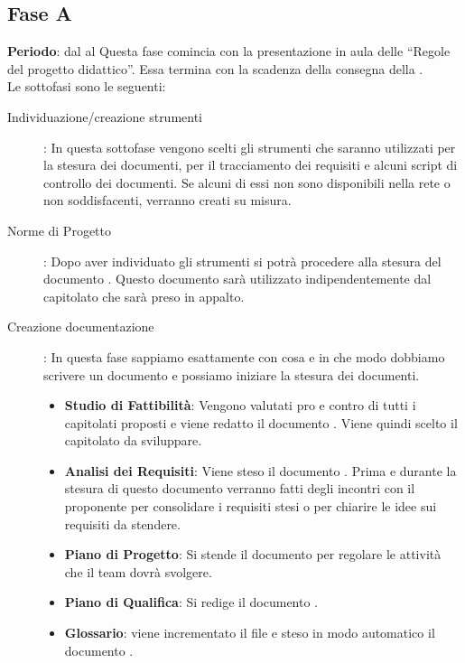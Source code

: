 \subsection{Fase A}
	\textbf{Periodo}: dal  al 
	Questa fase comincia con la presentazione in aula delle “Regole del progetto didattico”. Essa termina con la scadenza della consegna della .\\Le sottofasi sono le seguenti:
	\begin{description}
		\item[Individuazione/creazione strumenti]: In questa sottofase vengono scelti gli strumenti che saranno utilizzati per la stesura dei documenti, per il tracciamento dei requisiti e alcuni script di controllo dei documenti. Se alcuni di essi non sono disponibili nella rete o non soddisfacenti, verranno creati su misura.
		\item[Norme di Progetto]: Dopo aver individuato gli strumenti si potrà procedere alla stesura del documento . Questo documento sarà utilizzato indipendentemente dal capitolato che sarà preso in appalto.
		\item[Creazione documentazione]: In questa fase sappiamo esattamente con cosa e in che modo dobbiamo scrivere un documento e possiamo iniziare la stesura dei documenti.
			\begin{itemize}
				\item \textbf{Studio di Fattibilità}: Vengono valutati pro e contro di tutti i capitolati proposti e viene redatto il documento . 
				Viene quindi scelto il capitolato da sviluppare.
				\item \textbf{Analisi dei Requisiti}: Viene steso il documento . 
				Prima e durante la stesura di questo documento verranno fatti degli incontri con il proponente per consolidare i requisiti stesi o per chiarire le idee sui requisiti da stendere.
				\item \textbf{Piano di Progetto}: Si stende il documento  per regolare le attività che il team dovrà svolgere.
				\item \textbf{Piano di Qualifica}: Si redige il documento .
				\item \textbf{Glossario}: viene incrementato il file   e steso in modo automatico il documento .
			\end{itemize}
	\end{description}
